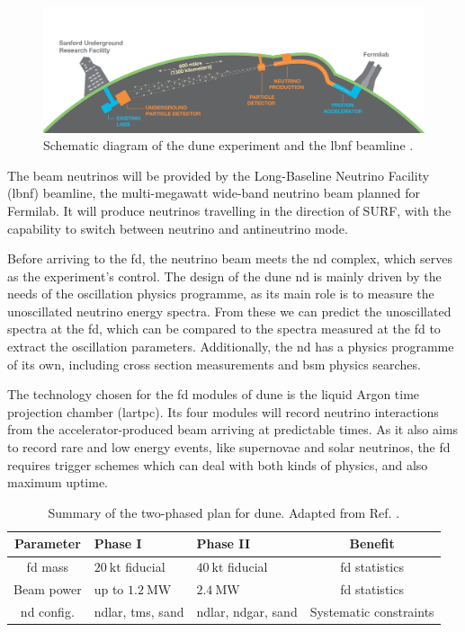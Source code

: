 \begin{figure}[t]
	\centering
	\includegraphics[width=0.9\linewidth]{Images/DUNE/FD/dune}
	\caption[Schematic diagram of the \gls{dune} experiment and the \gls{lbnf} beamline.]{Schematic diagram of the \gls{dune} experiment and the \gls{lbnf} beamline \cite{DUNE2020TDR1}.}
	\label{fig:dune}
\end{figure}

The beam neutrinos will be provided by the Long-Baseline Neutrino Facility (\gls{lbnf}) beamline, the multi-megawatt wide-band neutrino beam planned for Fermilab. It will produce neutrinos travelling in the direction of SURF, with the capability to switch between neutrino and antineutrino mode.

Before arriving to the \gls{fd}, the neutrino beam meets the \gls{nd} complex, which serves as the experiment's control. The design of the \gls{dune} \gls{nd} is mainly driven by the needs of the oscillation physics programme, as its main role is to measure the unoscillated neutrino energy spectra. From these we can predict the unoscillated spectra at the \gls{fd}, which can be compared to the spectra measured at the \gls{fd} to extract the oscillation parameters. Additionally, the \gls{nd} has a physics programme of its own, including cross section measurements and \gls{bsm} physics searches.

The technology chosen for the \gls{fd} modules of \gls{dune} is the liquid Argon time projection chamber (\gls{lartpc}). Its four modules will record neutrino interactions from the accelerator-produced beam arriving at predictable times. As it also aims to record rare and low energy events, like supernovae and solar neutrinos, the \gls{fd} requires trigger schemes which can deal with both kinds of physics, and also maximum uptime.

\begin{table}[]
	\caption[Summary of the two-phased plan for \gls{dune}.]{Summary of the two-phased plan for \gls{dune}. Adapted from Ref. \cite{DUNE2022Snowmass}.}
	\centering
	\begin{tabular}{c|C{3.0cm}|C{3.0cm}|c}
	Parameter  & Phase I                     & Phase II		& Benefit \\[1mm] \hline
	\rule{0pt}{1.1\normalbaselineskip}\gls{fd} mass    & $20 \ \mathrm{kt}$ fiducial & $40 \ \mathrm{kt}$ fiducial & \gls{fd} statistics\\[1mm]
	Beam power & up to $1.2 \ \mathrm{MW}$   & $2.4 \ \mathrm{MW}$      & \gls{fd} statistics  \\[1mm]
	\gls{nd} config.  & \gls{ndlar}, \gls{tms}, \gls{sand}           & \gls{ndlar}, \gls{ndgar}, \gls{sand} & Systematic constraints
	\end{tabular}
	\label{tab:dune_phases}
\end{table}

